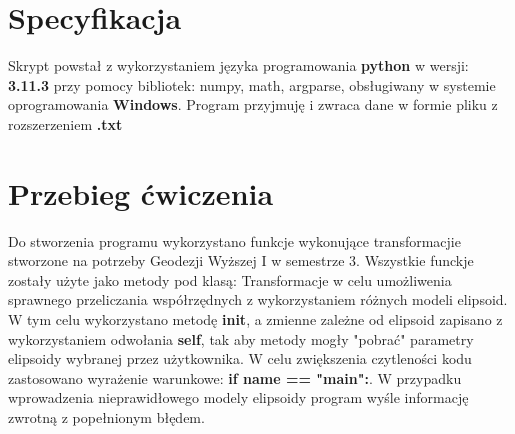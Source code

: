 \section{Specyfikacja}

\begin{flushleft}
	\hspace{1cm}Skrypt powstał z wykorzystaniem języka programowania \textbf{python} w wersji: \textbf{3.11.3} przy pomocy bibliotek: numpy, math, argparse, obsługiwany w systemie oprogramowania \textbf{Windows}. Program przyjmuję i zwraca dane w formie pliku z rozszerzeniem \textbf{.txt}
\end{flushleft}

\section{Przebieg ćwiczenia}

\begin{flushleft}
	\hspace{1cm}Do stworzenia programu wykorzystano funkcje wykonujące transformacjie stworzone na potrzeby Geodezji Wyższej I w semestrze 3. Wszystkie funckje zostały użyte jako metody pod klasą: Transformacje w celu umożliwenia sprawnego przeliczania współrzędnych z wykorzystaniem różnych modeli elipsoid. W tym celu wykorzystano metodę \textbf{init}, a zmienne zależne od elipsoid zapisano z wykorzystaniem odwołania \textbf{self}, tak aby metody mogły "pobrać" parametry elipsoidy wybranej przez użytkownika. W celu zwiększenia czytleności kodu zastosowano wyrażenie warunkowe: \textbf{if name == "main":}. W przypadku wprowadzenia nieprawidłowego modely elipsoidy program wyśle informację zwrotną z popełnionym błędem.
\end{flushleft}